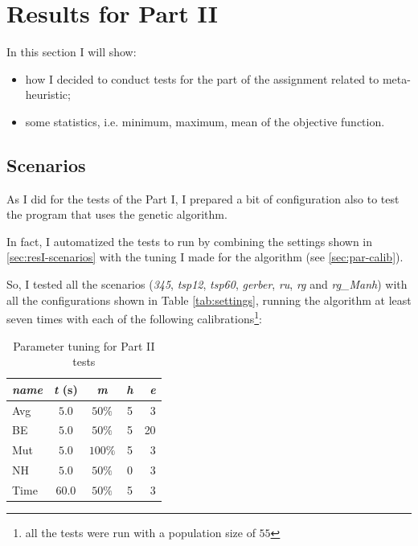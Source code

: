 \section{Results for Part II}

In this section I will show:
\begin{itemize}
  \item how I decided to conduct tests for the part of the assignment related
    to meta-heuristic;
  \item some statistics, i.e. minimum, maximum, mean of the objective function.
\end{itemize}

\subsection{Scenarios}

As I did for the tests of the Part I, I prepared a bit of configuration also
to test the program that uses the genetic algorithm.

In fact, I automatized the tests to run by combining the settings shown in
\ref{sec:resI-scenarios} with the tuning I made for the algorithm (see
\ref{sec:par-calib}).

So, I tested all the scenarios (\textit{345}, \textit{tsp12}, \textit{tsp60},
\textit{gerber}, \textit{ru}, \textit{rg} and \textit{rg\_Manh}) with all the
configurations shown in Table \ref{tab:settings}, running the algorithm at
least seven times with each of the following calibrations\footnote{all the
tests were run with a population size of $55$}:

\begin{table}[H]
  \centering
  \begin{tabular}{|l|c|c|c|r|}
    \hline
    \textbf{\textit{name}} & \textbf{\textit{t}} (s) & \textbf{\textit{m}} &
    \textbf{\textit{h}} & \textbf{\textit{e}} \\
    \hline
    \hline
    Avg & $5.0$ & $50\%$ & 5 & 3 \\
    \hline
    BE & $5.0$ & $50\%$ & 5 & 20 \\
    \hline
    Mut & $5.0$ & $100\%$ & 5 & 3 \\
    \hline
    NH & $5.0$ & $50\%$ & 0 & 3 \\
    \hline
    Time & $60.0$ & $50\%$ & 5 & 3 \\
    \hline
  \end{tabular}
  \caption{Parameter tuning for Part II tests}
  \label{tab:tuning}
\end{table}

